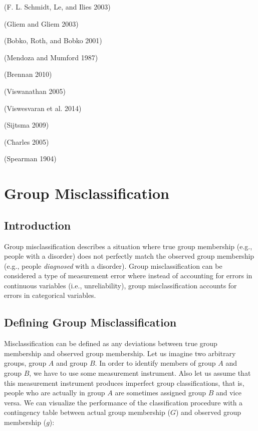 \documentclass[
  letterpaper,
  DIV=11,
  numbers=noendperiod]{scrreprt}
\begin{document}
(F. L. Schmidt, Le, and Ilies 2003)

(Gliem and Gliem 2003)

(Bobko, Roth, and Bobko 2001)

(Mendoza and Mumford 1987)

(Brennan 2010)

(Viswanathan 2005)

(Viswesvaran et al. 2014)

(Sijtsma 2009)

(Charles 2005)

(Spearman 1904)

\hypertarget{group-misclassification}{%
\chapter{Group Misclassification}\label{group-misclassification}}

\hypertarget{introduction-1}{%
\section{Introduction}\label{introduction-1}}

Group misclassification describes a situation where true group
membership (e.g., people with a disorder) does not perfectly match the
observed group membership (e.g., people \emph{diagnosed} with a
disorder). Group misclassification can be considered a type of
measurement error where instead of accounting for errors in continuous
variables (i.e., unreliability), group misclassification accounts for
errors in categorical variables.

\hypertarget{defining-group-misclassification}{%
\section{Defining Group
Misclassification}\label{defining-group-misclassification}}

Misclassification can be defined as any deviations between true group
membership and observed group membership. Let us imagine two arbitrary
groups, group \(A\) and group \(B\). In order to identify members of
group \(A\) and group \(B\), we have to use some measurement instrument.
Also let us assume that this measurement instrument produces imperfect
group classifications, that is, people who are actually in group \(A\)
are sometimes assigned group \(B\) and vice versa. We can visualize the
performance of the classification procedure with a contingency table
between actual group membership (\(G\)) and observed group membership
(\(g\)):
\end{document}
